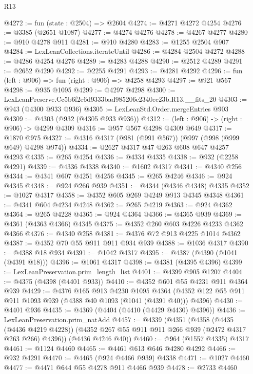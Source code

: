 \begin{lexlean}{R13}
\begin{coremodule}
@4272 := fun (state : @2504) => @2604
@4274 := @4271 @4272 @4254
@4276 := @3385 (@2651 @1087)
@4277 := @4274 @4276
@4278 := @4267 @4277
@4280 := @910 @4278 @911
@4281 := @910 @4280
@4283 := @1255 @2504 @907
@4284 := LexLeanCollections.iterateUntil
@4286 := @4284 @2504 @4272
@4288 := @4286 @4254 @4276
@4289 := @4283 @4288
@4290 := @2512 @4289
@4291 := @2652 @4290
@4292 := @2255 @4291
@4293 := @4281 @4292
@4296 := fun (left : @906) => fun (right : @906) => @4258 @4293
@4297 := @921 @567
@4298 := @935 @1095
@4299 := @4297 @4298
@4300 := LexLeanPreserve.Cc5b6f2e6d9333bad985206c2340ec23b.R13.__fits_20
@4303 := @943 (@4300 @933 @936)
@4305 := LexLeanStd.Order.mergeEntries @903
@4309 := @4303 (@932 (@4305 @933 @936))
@4312 := (left : @906) -> (right : @906) -> @4299 @4309
@4316 := @957 @567 @4298 @4309 @649
@4317 := @1870 @975
@4327 := @4316 @4317 (@981 (@991 @567)) (@997 (@998 (@999 @649) @4298 @974))
@4334 := @2627 @4317 @47 @263 @608 @647 @4257 @4293
@4335 := @265 @4254
@4336 := @4334 @4335
@4338 := @932 (@2258 @4291)
@4339 := @4336 @4338
@4340 := @1602 @4317
@4341 := @4340 @256
@4344 := @4341 @607 @4251 @4256
@4345 := @265 @4246
@4346 := @924 @4345
@4348 := @924 @266 @939
@4351 := @4344 (@4346 @4348) @4335
@4352 := @1027 @4317
@4358 := @4352 @605 @269 @4249 @913 @4345 @4348
@4361 := @4341 @604 @4234 @4248
@4362 := @265 @4219
@4363 := @924 @4362
@4364 := @265 @4228
@4365 := @924 @4364
@4366 := @4365 @939
@4369 := @4361 (@4363 @4366) @4345
@4375 := @4352 @260 @603 @4226 @4233 @4362 @4366
@4376 := @4340 @258
@4381 := @4376 @72 @913 @4225 @1014 @4362
@4387 := @4352 @70 @55 @911 @911 @934 @939
@4388 := @1036 @4317
@4390 := @4388 @18 @934
@4391 := @1042 @4317
@4395 := @4387 (@4390 (@1041 (@4391 @18)))
@4396 := @1061 @4317
@4398 := @4381 (@4395 @4396)
@4399 := LexLeanPreservation.prim_length_list
@4401 := @4399 @905 @1207
@4404 := @4375 (@4398 (@4401 @933))
@4410 := @4352 @601 @55 @4231 @911 @4364 @939
@4429 := @4376
    @165
    @913
    @4230
    @1095
    @4364
    (@4352 @122 @55 @911 @911 @1093 @939 (@4388 @40 @1093 (@1041 (@4391 @40))) @4396)
@4430 := @4401 @936
@4435 := @4369 (@4404 (@4410 (@4429 @4430) @4396))
@4436 := LexLeanPreservation.prim_natAdd
@4457 := @4339
    (@4351
      (@4358
        (@4435 (@4436 @4219 @4228))
        (@4352 @267 @55 @911 @911 @266 @939 (@2472 @4317 @263 @266) @4396))
      (@4436 @4246 @40))
@4460 := @964 (@1557 @4335) @4317
@4461 := @1124 @4460
@4465 := @4461 @613 @646 @4280 @4292
@4466 := @932 @4291
@4470 := @4465 (@924 @4466 @939) @4338
@4471 := @1027 @4460
@4477 := @4471 @644 @55 @4278 @911 @4466 @939
@4478 := @2733 @4460

\end{coremodule}
\end{lexlean}
